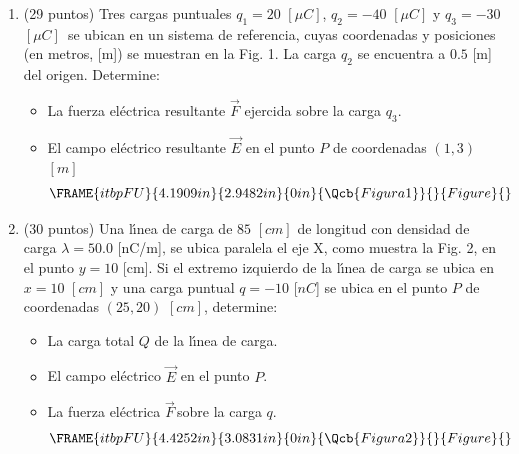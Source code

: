 \documentclass{article}
\begin{document}
\begin{enumerate}
\item (29 puntos) Tres cargas puntuales $q_{1}=20$ $[\mu C]$, $q_{2}=-40$ $%
[\mu C]$ y $q_{3}=-30$ $[\mu C]$\ se ubican en un sistema de referencia,
cuyas coordenadas y posiciones (en metros, [m]) se muestran en la Fig. 1. La
carga $q_{2}$ se encuentra a $0.5$ [m] del origen. Determine:

\begin{itemize}
\item La fuerza el\'{e}ctrica resultante $\vec{F}$ ejercida sobre la carga $%
q_{3}.$

\item El campo el\'{e}ctrico resultante $\vec{E}$ en el punto $P$ de
coordenadas $(1,3)$ $[m]$%
\begin{equation*}
\FRAME{itbpFU}{4.1909in}{2.9482in}{0in}{\Qcb{Figura 1}}{}{Figure}{\special%
{language "Scientific Word";type "GRAPHIC";maintain-aspect-ratio
TRUE;display "USEDEF";valid_file "T";width 4.1909in;height 2.9482in;depth
0in;original-width 10.28in;original-height 7.2195in;cropleft "0";croptop
"1";cropright "1";cropbottom "0";tempfilename
'SUT8RD03.bmp';tempfile-properties "XPR";}}
\end{equation*}%
\pagebreak 
\end{itemize}

\item (30 puntos) Una l\'{\i}nea de carga de $85$ $[cm]$ de longitud con
densidad de carga $\lambda =50.0$ [nC/m]$,\,$se ubica paralela el eje X,
como muestra la Fig. 2, en el punto $y=10$ [cm]. Si el extremo izquierdo de
la l\'{\i}nea de carga se ubica en $x=10$ $[cm]$ y una carga puntual $q=-10$
[$nC$] se ubica en el punto $P$ de coordenadas $(25,20)$ $[cm]$, determine:

\begin{itemize}
\item La carga total $Q$ de la l\'{\i}nea de carga.

\item El campo el\'{e}ctrico $\vec{E}$ en el punto $P$.

\item La fuerza el\'{e}ctrica $\vec{F}\,$sobre la carga $q.$ 
\begin{equation*}
\FRAME{itbpFU}{4.4252in}{3.0831in}{0in}{\Qcb{Figura 2}}{}{Figure}{\special%
{language "Scientific Word";type "GRAPHIC";maintain-aspect-ratio
TRUE;display "USEDEF";valid_file "T";width 4.4252in;height 3.0831in;depth
0in;original-width 10.6095in;original-height 7.3786in;cropleft "0";croptop
"1";cropright "1";cropbottom "0";tempfilename
'SUT9AH04.bmp';tempfile-properties "XPR";}}
\end{equation*}
\end{itemize}
\end{enumerate}
\end{document}
